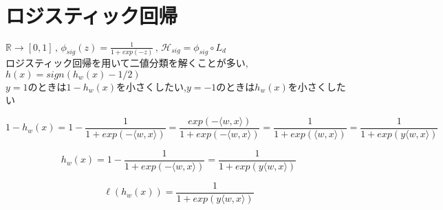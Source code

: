 \documentclass{jarticle}
\theoremstyle{definition}
\begin{document}
\section{ロジスティック回帰}
$\mathbb{R} \rightarrow [0,1] \, , \, \phi_{sig}(z) = \frac{1}{1 + exp(-z)} \, , \, \mathcal{H}_{sig} = \phi_{sig} \circ L_d $ \\
ロジスティック回帰を用いて二値分類を解くことが多い,$h(x) = sign(h_w(x)-1/2)$ \\
$y=1$のときは$1 -h_w(x)$を小さくしたい,$y=-1$のときは$h_w(x)$を小さくしたい \\
\begin{small}
\begin{equation}
1-h_w(x) = 1 - \frac{1}{1 + exp(- \langle w,x \rangle )} = \frac{exp(- \langle w,x \rangle )}{1 + exp(- \langle w,x \rangle )} = \frac{1}{1 + exp(\langle w,x \rangle )} = \frac{1}{1 + exp(y \langle w,x \rangle )}
\end{equation}
\end{small}
\begin{small}
\begin{equation}
h_w(x) = 1 - \frac{1}{1 + exp(- \langle w,x \rangle )} = \frac{1}{1 + exp(y \langle w,x \rangle )}
\end{equation}
\end{small} 
\begin{small}
\begin{equation}
\ell(h_w(x)) = \frac{1}{1 + exp(y \langle w,x \rangle )}
\end{equation}
\end{small} 
\end{document}
